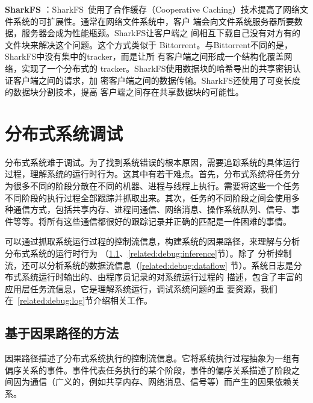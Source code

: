 \textbf{SharkFS} ：SharkFS~\cite{sharkfs}使用了合作缓存（Cooperative
Caching）技术提高了网络文件系统的可扩展性。通常在网络文件系统中，客户
端会向文件系统服务器所要数据，服务器会成为性能瓶颈。SharkFS让客户端之
间相互下载自己没有对方有的文件块来解决这个问题。这个方式类似于
Bittorrent。与Bittorrent不同的是，SharkFS中没有集中的tracker，而是让所
有客户端之间形成一个结构化覆盖网络\cite{coral}，实现了一个分布式的
tracker。SharkFS使用数据块的哈希导出的共享密钥认证客户端之间的请求，加
密客户端之间的数据传输。SharkFS还使用了可变长度的数据块分割技术，提高
客户端之间存在共享数据块的可能性。


\section{分布式系统调试}

分布式系统难于调试。为了找到系统错误的根本原因，需要追踪系统的具体运行
过程，理解系统的运行时行为。这其中有若干难点。首先，分布式系统将任务分
为很多不同的阶段分散在不同的机器、进程与线程上执行。需要将这些一个任务
不同阶段的执行过程全部跟踪并抓取出来。其次，任务的不同阶段之间会使用多
种通信方式，包括共享内存、进程间通信、网络消息、操作系统队列、信号、事
件等等。将所有这些通信都很好的跟踪记录并正确的匹配是一件困难的事情。

% 
% 
% 

可以通过抓取系统运行过程的控制流信息，构建系统的因果路径，来理解与分析
分布式系统的运行时行为
（\ref{related:debug:casual}、\ref{related:debug:inference}节）。除了
分析控制流，还可以分析系统的数据流信息（\ref{related:debug:dataflow}
节）。系统日志是分布式系统运行时输出的、由程序员记录的对系统运行过程的
描述，包含了丰富的应用层任务流信息，它是理解系统运行，调试系统问题的重
要资源，我们在~\ref{related:debug:log}节介绍相关工作。

\subsection{基于因果路径的方法}
\label{related:debug:casual}

因果路径描述了分布式系统执行的控制流信息。它将系统执行过程抽象为一组有
偏序关系的事件。事件代表任务执行的某个阶段，事件的偏序关系描述了阶段之
间因为通信（广义的，例如共享内存、网络消息、信号等）而产生的因果依赖关
系。

